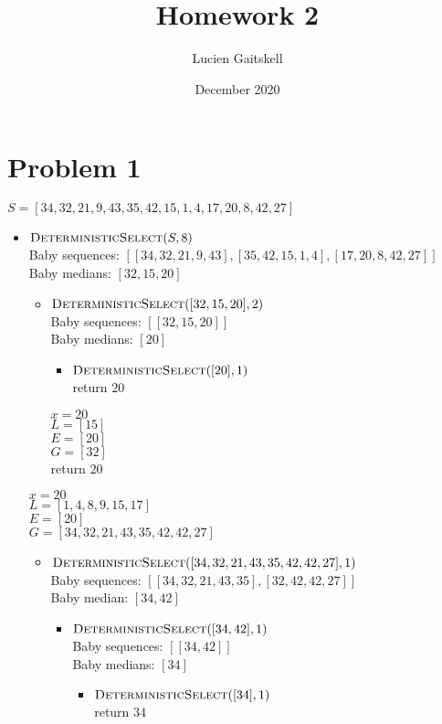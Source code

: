 \documentclass{article}
\title{Homework 2}
\author{Lucien Gaitskell}
\date{December 2020}
\begin{document}
\maketitle

\section{Problem 1}

$S = [34,32,21,9,43,35,42,15,1,4,17,20,8,42,27]$

\begin{itemize}
    \item $\textproc{DeterministicSelect}(S, 8)$ \\
    Baby sequences: $[[34,32,21,9,43],[35,42,15,1,4],[17,20,8,42,27]]$ \\
    Baby medians: $[32,15,20]$

    \begin{itemize}
        \item $\textproc{DeterministicSelect}([32, 15, 20],2)$ \\
        Baby sequences: $[[32,15,20]]$ \\
        Baby medians: $[20]$

        \begin{itemize}
            \item $\textproc{DeterministicSelect}([20],1)$ \\
            return $20$

        \end{itemize}
        $x = 20 $ \\
        $L = [15] $ \\
        $E = [20] $ \\
        $G = [32] $ \\
        return $20$

    \end{itemize}

    $x = 20$ \\
    $L = [1,4,8,9,15,17]$ \\
    $E = [20]$ \\
    $G = [34,32,21,43,35,42,42,27]$

    \begin{itemize}
        \item $\textproc{DeterministicSelect}([34,32,21,43,35,42,42,27],1)$ \\
        Baby sequences: $[[34,32,21,43,35],[32,42,42,27]]$ \\
        Baby median: $[34, 42]$
        \begin{itemize}
            \item $\textproc{DeterministicSelect}([34, 42],1)$ \\
            Baby sequences: $[[34, 42]]$ \\
            Baby medians: $[34]$
            \begin{itemize}
                \item $\textproc{DeterministicSelect}([34],1)$ \\
                return $34$
            \end{itemize}
            

\end{itemize}
\end{itemize}
\end{itemize}
\end{document}
